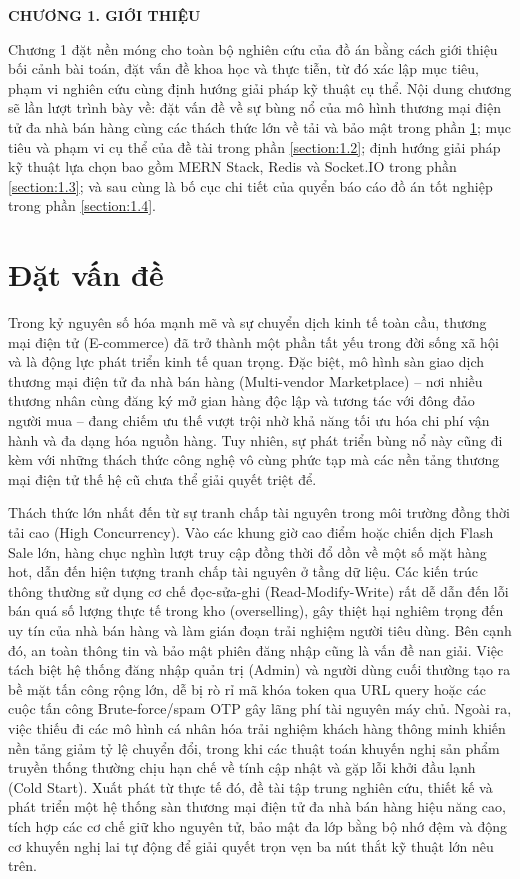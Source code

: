 \documentclass[../DoAn.tex]{subfiles}
\begin{document}
\begin{center}
    \Large{\textbf{CHƯƠNG 1. GIỚI THIỆU}}\\
\end{center}
\vspace{1cm}

Chương 1 đặt nền móng cho toàn bộ nghiên cứu của đồ án bằng cách giới thiệu bối cảnh bài toán, đặt vấn đề khoa học và thực tiễn, từ đó xác lập mục tiêu, phạm vi nghiên cứu cùng định hướng giải pháp kỹ thuật cụ thể. Nội dung chương sẽ lần lượt trình bày về: đặt vấn đề về sự bùng nổ của mô hình thương mại điện tử đa nhà bán hàng cùng các thách thức lớn về tải và bảo mật trong phần \ref{section:1.1}; mục tiêu và phạm vi cụ thể của đề tài trong phần \ref{section:1.2}; định hướng giải pháp kỹ thuật lựa chọn bao gồm MERN Stack, Redis và Socket.IO trong phần \ref{section:1.3}; và sau cùng là bố cục chi tiết của quyển báo cáo đồ án tốt nghiệp trong phần \ref{section:1.4}.

\section{Đặt vấn đề}
\label{section:1.1}
Trong kỷ nguyên số hóa mạnh mẽ và sự chuyển dịch kinh tế toàn cầu, thương mại điện tử (E-commerce) đã trở thành một phần tất yếu trong đời sống xã hội và là động lực phát triển kinh tế quan trọng. Đặc biệt, mô hình sàn giao dịch thương mại điện tử đa nhà bán hàng (Multi-vendor Marketplace) – nơi nhiều thương nhân cùng đăng ký mở gian hàng độc lập và tương tác với đông đảo người mua – đang chiếm ưu thế vượt trội nhờ khả năng tối ưu hóa chi phí vận hành và đa dạng hóa nguồn hàng. Tuy nhiên, sự phát triển bùng nổ này cũng đi kèm với những thách thức công nghệ vô cùng phức tạp mà các nền tảng thương mại điện tử thế hệ cũ chưa thể giải quyết triệt để.

Thách thức lớn nhất đến từ sự tranh chấp tài nguyên trong môi trường đồng thời tải cao (High Concurrency). Vào các khung giờ cao điểm hoặc chiến dịch Flash Sale lớn, hàng chục nghìn lượt truy cập đồng thời đổ dồn về một số mặt hàng hot, dẫn đến hiện tượng tranh chấp tài nguyên ở tầng dữ liệu. Các kiến trúc thông thường sử dụng cơ chế đọc-sửa-ghi (Read-Modify-Write) rất dễ dẫn đến lỗi bán quá số lượng thực tế trong kho (overselling), gây thiệt hại nghiêm trọng đến uy tín của nhà bán hàng và làm gián đoạn trải nghiệm người tiêu dùng. Bên cạnh đó, an toàn thông tin và bảo mật phiên đăng nhập cũng là vấn đề nan giải. Việc tách biệt hệ thống đăng nhập quản trị (Admin) và người dùng cuối thường tạo ra bề mặt tấn công rộng lớn, dễ bị rò rỉ mã khóa token qua URL query hoặc các cuộc tấn công Brute-force/spam OTP gây lãng phí tài nguyên máy chủ. Ngoài ra, việc thiếu đi các mô hình cá nhân hóa trải nghiệm khách hàng thông minh khiến nền tảng giảm tỷ lệ chuyển đổi, trong khi các thuật toán khuyến nghị sản phẩm truyền thống thường chịu hạn chế về tính cập nhật và gặp lỗi khởi đầu lạnh (Cold Start). Xuất phát từ thực tế đó, đề tài tập trung nghiên cứu, thiết kế và phát triển một hệ thống sàn thương mại điện tử đa nhà bán hàng hiệu năng cao, tích hợp các cơ chế giữ kho nguyên tử, bảo mật đa lớp bằng bộ nhớ đệm và động cơ khuyến nghị lai tự động để giải quyết trọn vẹn ba nút thắt kỹ thuật lớn nêu trên.
\end{document}
